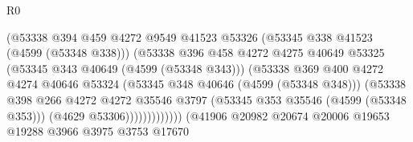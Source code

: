 \begin{lexlean}{R0}
\begin{coremodule}
                                                  (@53338
                                                    @394
                                                    @459
                                                    @4272
                                                    @9549
                                                    @41523
                                                    @53326
                                                    (@53345 @338 @41523 (@4599 (@53348 @338)))
                                                    (@53338
                                                      @396
                                                      @458
                                                      @4272
                                                      @4275
                                                      @40649
                                                      @53325
                                                      (@53345 @343 @40649 (@4599 (@53348 @343)))
                                                      (@53338
                                                        @369
                                                        @400
                                                        @4272
                                                        @4274
                                                        @40646
                                                        @53324
                                                        (@53345 @348 @40646 (@4599 (@53348 @348)))
                                                        (@53338
                                                          @398
                                                          @266
                                                          @4272
                                                          @4272
                                                          @35546
                                                          @3797
                                                          (@53345 @353 @35546 (@4599 (@53348 @353)))
                                                          (@4629 @53306)))))))))))))
                                  (@41906
                                    @20982
                                    @20674
                                    @20006
                                    @19653
                                    @19288
                                    @3966
                                    @3975
                                    @3753
                                    @17670

\end{coremodule}
\end{lexlean}
